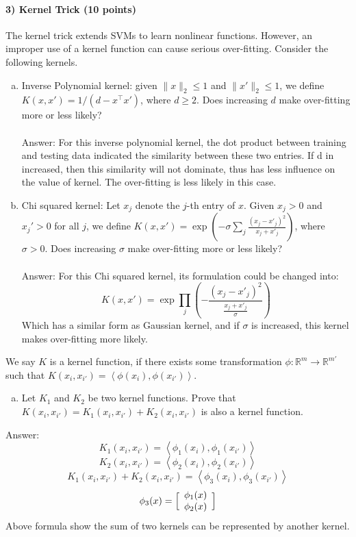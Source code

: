 \documentclass[11pt]{article}
\begin{document}
\paragraph{3) Kernel Trick (10 points)}
The kernel trick extends SVMs to learn nonlinear functions. However, an improper use of a kernel function can cause serious over-fitting. Consider the following kernels.
\begin{enumerate}[(a)]
\item Inverse Polynomial kernel: given $\|x\|_2\leq 1$ and $\|x'\|_2\leq 1$, we define $K(x, x') = 1/(d-x^\top x')$, where $d\geq 2$. Does increasing $d$ make over-fitting more or less likely?\\\\
Answer: For this inverse polynomial kernel, the dot product between training and testing data indicated the similarity between these two entries. If d in increased, then this similarity will not dominate, thus has less influence on the value of kernel. The over-fitting is less likely in this case.\\

\item Chi squared kernel: Let $x_j$ denote the $j$-th entry of $x$. Given $x_j>0$ and $x_j'>0$ for all $j$, we define $K(x, x') = \exp\left(-\sigma\sum_j\frac{(x_j-x'_j)^2}{x_j+x'_j}\right)$, where $\sigma>0$. Does increasing $\sigma$ make over-fitting more or less likely?\\\\
Answer: For this Chi squared kernel, its formulation could be changed into: 
$$K(x, x') = \exp\prod_j\left(-\frac{(x_j-x'_j)^2}{\frac{x_j+x'_j}{\sigma}}\right)$$
Which has a similar form as Gaussian kernel, and if $\sigma$ is increased, this kernel makes over-fitting more likely.\\


\end{enumerate}
We say $K$ is a kernel function, if there exists some transformation $\phi:\mathbb{R}^m\rightarrow \mathbb{R}^{m'}$ such that $K(x_i,x_{i'}) = \left<\phi(x_i),\phi(x_{i'})\right>$.
\begin{enumerate}[(c)]
\item Let $K_1$ and $K_2$ be two kernel functions. Prove that $K(x_i,x_{i'}) = K_1(x_i,x_{i'}) + K_2(x_i,x_{i'})$ is also a kernel function.
\end{enumerate}

Answer: 
$$K_1(x_i,x_{i'}) = \left<\phi_1(x_i),\phi_1(x_{i'})\right>$$
$$K_2(x_i,x_{i'}) = \left<\phi_2(x_i),\phi_2(x_{i'})\right>$$
$$K_1(x_i,x_{i'}) + K_2(x_i,x_{i'}) =  \left<\phi_3(x_i),\phi_3(x_{i'})\right>$$
$$\phi_3(x) = \Big[ {\begin{array}{*{20}c}
\phi_1(x) \\
\phi_2(x) \\
\end{array} }\Big]$$
Above formula show the sum of two kernels can be represented by another kernel.
\end{document}
